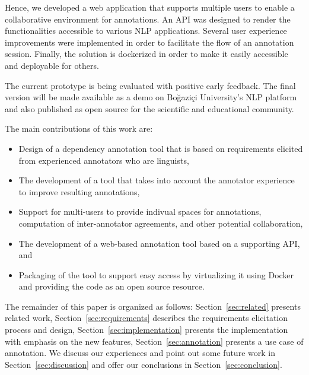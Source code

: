 Hence, we developed a web application that supports multiple users to enable a collaborative environment for annotations.
An API was designed to render the functionalities accessible to various NLP applications.
Several user experience improvements were implemented in order to facilitate the flow of an annotation session.
Finally, the solution is dockerized in order to make it easily accessible and deployable for others.

The current prototype is being evaluated with positive early feedback.
The final version will be made available as a demo on Boğaziçi University's NLP platform~\cite{DIP} and also published as open source for the scientific and educational community.

The main contributions of this work are:
\begin{itemize}
        \item Design of a dependency annotation tool that is based on requirements elicited from experienced annotators who are linguists,
        \item The development of a tool that takes into account the annotator experience to improve resulting annotations,
        \item Support for multi-users to provide indivual spaces for annotations, computation of inter-annotator agreements, and other potential collaboration,
        \item The development of a web-based annotation tool based on a supporting API, and
        \item Packaging of the tool to support easy access by virtualizing it using Docker and providing the code as an open source resource.
\end{itemize}
The remainder of this paper is organized as follows:
Section~\ref{sec:related} presents related work,
Section~\ref{sec:requirements} describes the requirements elicitation process and design,
Section~\ref{sec:implementation} presents the implementation with emphasis on the new features,
Section~\ref{sec:annotation} presents a use case of annotation.
We discuss our experiences and point out some future work in Section~\ref{sec:discussion} and offer our conclusions  in Section~\ref{sec:conclusion}.
